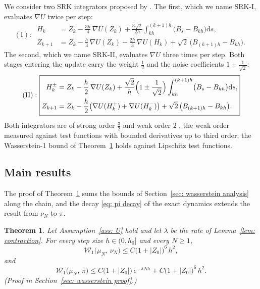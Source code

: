 \documentclass[namedate,webpdf,imanum]{ima-authoring-template}
\newcommand{\Le}{\leqslant}
\newcommand{\Ge}{\geqslant}
\newcommand{\D}{\mathrm{d}}
\theoremstyle{thmstyletwo}
\newtheorem{theorem}{Theorem}
\numberwithin{equation}{section}
\begin{document}
We consider two SRK integrators proposed by \citet{yang2026accelerating}. The first, which we name SRK-I, evaluates $\nabla U$ twice per step:
\begin{equation}
\mathrm{(I):~}
	\boxed{\begin{aligned}
		H_k & = Z_k - \frac{3h}{4}\, \nabla U(Z_k) + \frac{3\sqrt2}{2h} \int_{kh}^{(k+1)h} \bigl( B_s - B_{kh} \bigr) \D s , \\
		Z_{k+1} & = Z_k - \frac h3\, \nabla U(Z_k) - \frac{2h}3\, \nabla U(H_k) + \sqrt2\, \bigl( B_{(k+1)h} - B_{kh} \bigr) .
	\end{aligned}}
	\label{eq: srk1}
\end{equation}
The second, which we name SRK-II, evaluates $\nabla U$ three times per step. Both stages entering the update carry the weight $\frac12$ and the noise coefficients $1 \pm \frac1{\sqrt2}$:
\begin{equation}
	\mathrm{(II):~}
	\boxed{
\begin{aligned}
    H_k^{\pm} &= Z_k - \frac h2\, \nabla U(Z_k) + \frac{\sqrt2}{h} \Bigl( 1 \pm \frac{1}{\sqrt2} \Bigr) \int_{kh}^{(k+1)h} \bigl( B_s - B_{kh} \bigr) \D s , \\
    Z_{k+1} &= Z_k - \frac h2 \bigl( \nabla U(H_k^{+}) + \nabla U(H_k^{-}) \bigr) + \sqrt2\, \bigl( B_{(k+1)h} - B_{kh} \bigr) .
\end{aligned}}
\label{eq: srk2}
\end{equation}
Both integrators are of strong order $\frac32$ \citep{yang2026accelerating} and weak order $2$ \citep{ye2026mse}, the weak order measured against test functions with bounded derivatives up to third order; the Wasserstein-1 bound of Theorem~\ref{thm: wasserstein} holds against Lipschitz test functions.

\subsection{Main results}
\label{subsec: wasserstein results}

The proof of Theorem~\ref{thm: wasserstein} sums the bounds of Section~\ref{sec: wasserstein analysis} along the chain, and the decay \eqref{eq: pi decay} of the exact dynamics extends the result from $\nu_N$ to $\pi$.

\begin{theorem}
\label{thm: wasserstein}
    Let Assumption~\ref{ass: U} hold and let $\lambda$ be the rate of Lemma~\ref{lem: contraction}. For every step size $h \in (0,h_0]$ and every $N \Ge 1$,
    \begin{equation}
        \mathcal W_1\bigl( \mu_N ,\, \nu_N \bigr)
        \Le C \bigl( 1 + |Z_0| \bigr)^{6}\, h^2 ,
        \label{eq: wasserstein bound}
    \end{equation}
    and
    \begin{equation}
        \mathcal W_1\bigl( \mu_N ,\, \pi \bigr)
        \Le C \bigl( 1 + |Z_0| \bigr)\, e^{-\lambda N h}
        + C \bigl( 1 + |Z_0| \bigr)^{6}\, h^2 .
        \label{eq: wasserstein pi}
    \end{equation}
    \emph{(Proof in Section~\ref{sec: wasserstein proof}.)}
\end{theorem}
\end{document}
